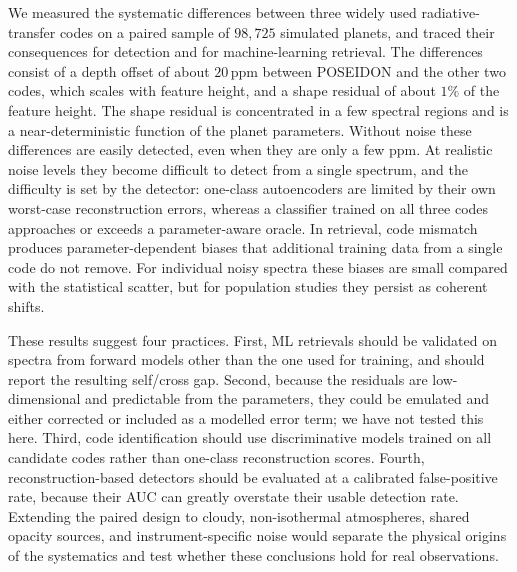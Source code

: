 We measured the systematic differences between three widely used radiative-transfer codes on a paired sample of $98{,}725$ simulated planets, and traced their consequences for detection and for machine-learning retrieval.
The differences consist of a depth offset of about $20\,\mathrm{ppm}$ between POSEIDON and the other two codes, which scales with feature height, and a shape residual of about $1\%$ of the feature height.
The shape residual is concentrated in a few spectral regions and is a near-deterministic function of the planet parameters.
Without noise these differences are easily detected, even when they are only a few ppm.
At realistic noise levels they become difficult to detect from a single spectrum, and the difficulty is set by the detector: one-class autoencoders are limited by their own worst-case reconstruction errors, whereas a classifier trained on all three codes approaches or exceeds a parameter-aware oracle.
In retrieval, code mismatch produces parameter-dependent biases that additional training data from a single code do not remove.
For individual noisy spectra these biases are small compared with the statistical scatter, but for population studies they persist as coherent shifts.

These results suggest four practices.
First, ML retrievals should be validated on spectra from forward models other than the one used for training, and should report the resulting self/cross gap.
Second, because the residuals are low-dimensional and predictable from the parameters, they could be emulated and either corrected or included as a modelled error term; we have not tested this here.
Third, code identification should use discriminative models trained on all candidate codes rather than one-class reconstruction scores.
Fourth, reconstruction-based detectors should be evaluated at a calibrated false-positive rate, because their AUC can greatly overstate their usable detection rate.
Extending the paired design to cloudy, non-isothermal atmospheres, shared opacity sources, and instrument-specific noise would separate the physical origins of the systematics and test whether these conclusions hold for real observations.
